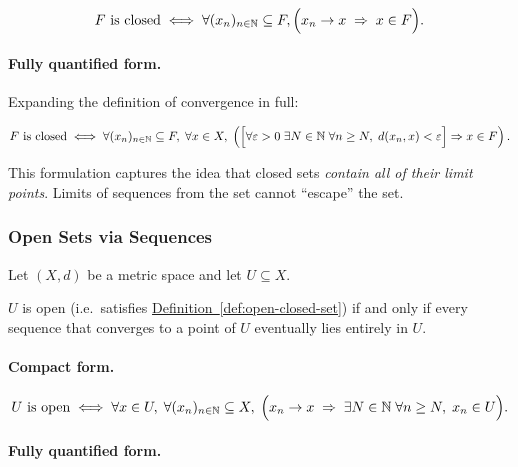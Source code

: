 \[
F \text{ is closed}
\iff
\forall (x_n)_{n\in\mathbb{N}} \subseteq F,
\Bigl(
  x_n \to x
  \;\Rightarrow\;
  x \in F
\Bigr).
\]

\paragraph{Fully quantified form.}

Expanding the definition of convergence in full:

\[
F \text{ is closed}
\iff
\forall (x_n)_{n\in\mathbb{N}} \subseteq F,\;
\forall x \in X,\;
\left(
  \Bigl[
    \forall \varepsilon>0\;
    \exists N\in\mathbb{N}\;
    \forall n\ge N,\;
    d(x_n,x)<\varepsilon
  \Bigr]
  \Rightarrow
  x\in F
\right).
\]

\begin{remark*}
This formulation captures the idea that closed sets
\emph{contain all of their limit points}.
Limits of sequences from the set cannot ``escape'' the set.
\end{remark*}

\subsubsection{Open Sets via Sequences}

\begin{tcolorbox}[colback=propbox, colframe=propborder, arc=2pt,
  left=6pt, right=6pt, top=4pt, bottom=4pt,
  title={\small\textbf{Sequential Characterization (Open Sets)}},
  fonttitle=\small\bfseries]
\label{def:open-sequential}
Let $(X,d)$ be a metric space and let $U \subseteq X$.

\medskip
$U$ is open (i.e.\ satisfies \hyperref[def:open-closed-set]{Definition~\ref*{def:open-closed-set}})
if and only if every sequence that converges to a point of $U$ eventually
lies entirely in $U$.
\end{tcolorbox}

\paragraph{Compact form.}

\[
U \text{ is open}
\iff
\forall x\in U,\;
\forall (x_n)_{n\in\mathbb{N}} \subseteq X,\;
\Bigl(
  x_n \to x
  \;\Rightarrow\;
  \exists N\in\mathbb{N}\;
  \forall n\ge N,\;
  x_n\in U
\Bigr).
\]

\paragraph{Fully quantified form.}

